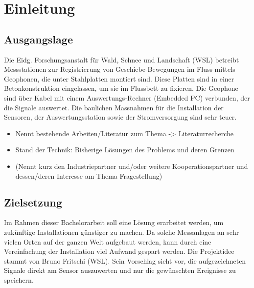 %
%

\chapter{Einleitung}\label{chap.einleitung}



\section{Ausgangslage}\label{sec.ausgangslage}
Die Eidg. Forschungsanstalt für Wald, Schnee und Landschaft (WSL) betreibt Messstationen zur Registrierung von Geschiebe-Bewegungen im Fluss mittels Geophonen, die unter Stahlplatten montiert sind. Diese Platten sind in einer Betonkonstruktion eingelassen, um sie im Flussbett zu fixieren. Die Geophone sind über Kabel mit einem Auswertungs-Rechner (Embedded PC) verbunden, der die Signale auswertet. Die baulichen Massnahmen für die Installation der Sensoren, der Auswertungsstation sowie der Stromversorgung sind sehr teuer. 

\begin{itemize}
\item Nennt bestehende Arbeiten/Literatur zum Thema -> Literaturrecherche
\item Stand der Technik: Bisherige Lösungen des Problems und deren Grenzen
\item (Nennt kurz den Industriepartner und/oder weitere Kooperationspartner und dessen/deren Interesse am Thema Fragestellung)
\end{itemize}



\section{Zielsetzung}\label{sec.zielsetzung}
Im Rahmen dieser Bachelorarbeit soll eine Lösung erarbeitet werden, um zukünftige Installationen günstiger zu machen. Da solche Messanlagen an sehr vielen Orten auf der ganzen Welt aufgebaut werden, kann durch eine Vereinfachung der Installation viel Aufwand gespart werden. Die Projektidee stammt von Bruno Fritschi (WSL). Sein Vorschlag sieht vor, die aufgezeichneten Signale direkt am Sensor auszuwerten und nur die gewünschten Ereignisse zu speichern.

